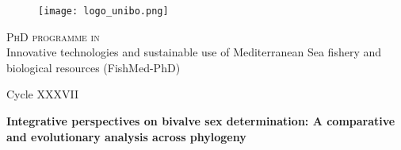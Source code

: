 
{
    \textwidth=450pt

    \begin{titlepage}

    \begin{center}

    \begin{figure}[h]
        \centering
        \texttt{[image: logo\_unibo.png]}
        \label{fig:logo}
    \end{figure}

    {{\large{\textsc{PhD programme in}} \\
    Innovative technologies and sustainable use of Mediterranean Sea fishery and biological resources (FishMed-PhD)}} 
    \vspace{5mm}

    {\large{Cycle XXXVII}}
    \vspace{5mm}
    \end{center}

    {}

    \vspace{15mm}

    \begin{center} {

        {\LARGE{\bf Integrative perspectives on bivalve sex determination: A comparative and evolutionary analysis across phylogeny}}\\




    }\end{center}

    \vspace{15mm} \par \noindent


\end{titlepage}}
